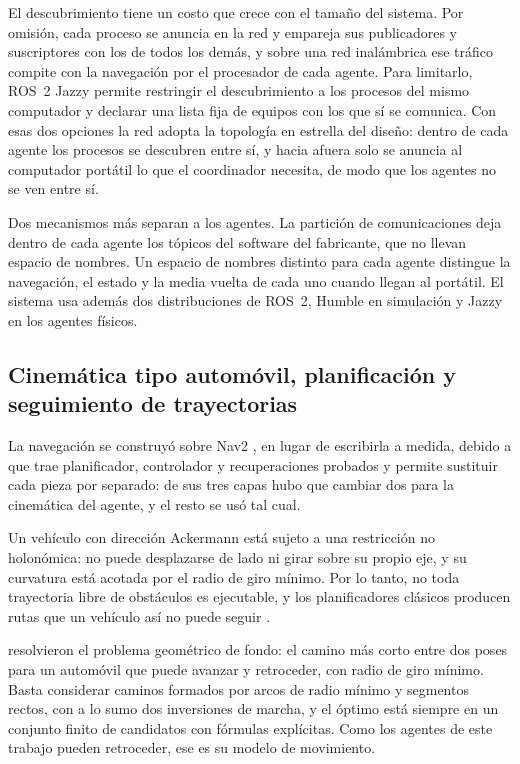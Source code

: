 El descubrimiento tiene un costo que crece con el tamaño del sistema. Por
omisión, cada proceso se anuncia en la red y empareja sus publicadores y
suscriptores con los de todos los demás, y sobre una red inalámbrica ese tráfico
compite con la navegación por el procesador de cada agente. Para limitarlo, ROS~2 Jazzy permite restringir el
descubrimiento a los procesos del mismo computador y declarar una lista fija de
equipos con los que sí se comunica. Con esas dos opciones la red adopta la
topología en estrella del diseño: dentro de cada agente los procesos se
descubren entre sí, y hacia afuera solo se anuncia al computador portátil lo que
el coordinador necesita, de modo que los agentes no se ven entre sí.

Dos mecanismos más separan a los agentes. La partición de comunicaciones deja
dentro de cada agente los tópicos del software del fabricante, que no llevan
espacio de nombres. Un espacio de nombres distinto para cada agente distingue la navegación, el estado y la media vuelta de cada uno cuando llegan al portátil. El sistema usa además dos distribuciones de ROS~2, Humble en simulación y Jazzy en los agentes físicos.

\subsection{Cinemática tipo automóvil, planificación y seguimiento de trayectorias}
\label{sec:teo-planificacion}

La navegación se construyó sobre Nav2 \autocite{macenski2020marathon}, en lugar de escribirla a
medida, debido a que trae planificador, controlador y recuperaciones probados y permite sustituir
cada pieza por separado: de sus tres capas hubo que cambiar dos para la cinemática del agente, y el
resto se usó tal cual.

Un vehículo con dirección Ackermann está sujeto a una restricción no holonómica: no puede desplazarse
de lado ni girar sobre su propio eje, y su curvatura está acotada por el radio de giro mínimo. Por lo
tanto, no toda trayectoria libre de obstáculos es ejecutable, y los planificadores clásicos producen
rutas que un vehículo así no puede seguir \autocite{macenski2024smac}.

\textcite{reeds1990optimal} resolvieron el problema geométrico de fondo: el
camino más corto entre dos poses para un automóvil que puede avanzar y
retroceder, con radio de giro mínimo. Basta considerar caminos formados por arcos
de radio mínimo y segmentos rectos, con a lo sumo dos inversiones de marcha, y el
óptimo está siempre en un conjunto finito de candidatos con fórmulas explícitas.
Como los agentes de este trabajo pueden retroceder, ese es su modelo de movimiento.

